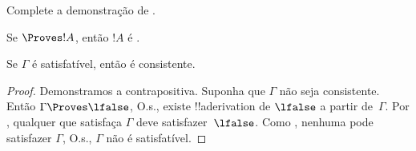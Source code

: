 \documentclass[../../../include/open-logic-section]{subfiles}
\begin{document}
\begin{prob}
  Complete a demonstração de .
\end{prob}
\tagendprob

\begin{cor}
Se $\Proves !A$, então $!A$ é .
\end{cor}

\begin{cor}
Se $\Gamma$ é satisfatível, então é consistente.
\end{cor}

\begin{proof}
Demonstramos a contrapositiva. Suponha que $\Gamma$ não seja
consistente. Então $\Gamma \Proves \lfalse$, O.s.\@, existe
!!a{derivation} de $\lfalse$ a partir de~$\Gamma$. Por
, qualquer
que satisfaça $\Gamma$ deve satisfazer~$\lfalse$. Como
, nenhuma
 pode satisfazer $\Gamma$, O.s.\@, $\Gamma$ não é satisfatível.
\end{proof}
\end{document}
